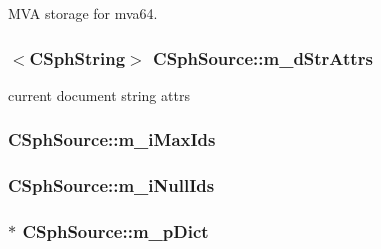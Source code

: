 M\-V\-A storage for mva64. 

\hypertarget{classCSphSource_ab504e862bb01cd4e5e755f2713a14234}{
\subsubsection[{m\-\_\-d\-Str\-Attrs}]{$<${\bf C\-Sph\-String}$>$ C\-Sph\-Source\-::m\-\_\-d\-Str\-Attrs}}\label{classCSphSource_ab504e862bb01cd4e5e755f2713a14234}


current document string attrs 

\hypertarget{classCSphSource_ac05e31f4dc3b344d46ef7417ded093b8}{
\subsubsection[{m\-\_\-i\-Max\-Ids}]{ C\-Sph\-Source\-::m\-\_\-i\-Max\-Ids\hspace{0.3cm}{\ttfamily [protected]}}}\label{classCSphSource_ac05e31f4dc3b344d46ef7417ded093b8}
\hypertarget{classCSphSource_a667ff9e98ab9a219f7e49faf2e94b887}{
\subsubsection[{m\-\_\-i\-Null\-Ids}]{ C\-Sph\-Source\-::m\-\_\-i\-Null\-Ids\hspace{0.3cm}{\ttfamily [protected]}}}\label{classCSphSource_a667ff9e98ab9a219f7e49faf2e94b887}
\hypertarget{classCSphSource_a4ac924707004945af25424567105a7e8}{
\subsubsection[{m\-\_\-p\-Dict}]{$\ast$ C\-Sph\-Source\-::m\-\_\-p\-Dict\hspace{0.3cm}{\ttfamily [protected]}}}\label{classCSphSource_a4ac924707004945af25424567105a7e8}


